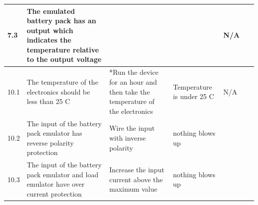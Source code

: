 \begin{table}[!ht]
\begin{tabular}{|p{0.3cm}|p{3cm}|p{7cm}|p{3cm}|p{1.5cm}|p{1cm}|}
        7.3 & The emulated battery pack has an output which indicates the temperature relative to the output voltage & ~ & ~ & N/A & ~ \\ \hline
        10.1 & The temperature of the electronics should be less than 25 C & *Run the device for an hour and then take the temperature of the electronics & Temperature is under 25 C & N/A & ~ \\ \hline
        10.2 & The input of the battery pack emulator has reverse polarity protection & Wire the input with inverse polarity  & nothing blows up & ~ & ~ \\ \hline
        10.3 & The input of the battery pack emulator and load emulator have over current protection & Increase the input current above the maximum value  & nothing blows up  & ~ & ~ \\ \hline
    \end{tabular}
\end{table}